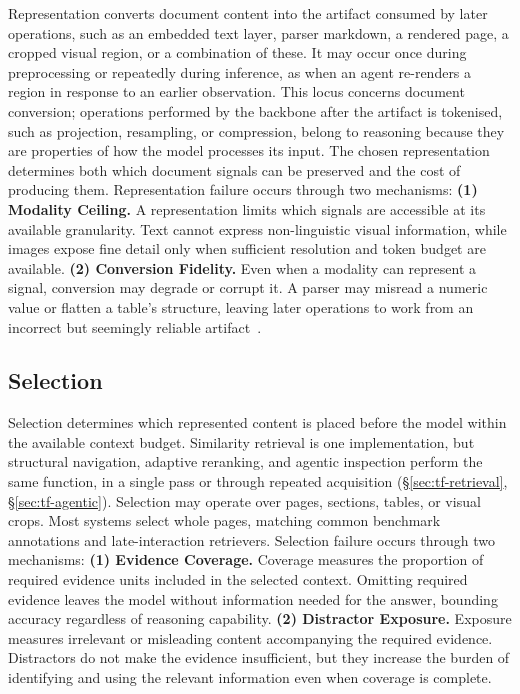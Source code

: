 Representation converts document content into the artifact consumed by later operations, such as an embedded text layer, parser markdown, a rendered page, a cropped visual region, or a combination of these. It may occur once during preprocessing or repeatedly during inference, as when an agent re-renders a region in response to an earlier observation. This locus concerns document conversion; operations performed by the backbone after the artifact is tokenised, such as projection, resampling, or compression, belong to reasoning because they are properties of how the model processes its input. The chosen representation determines both which document signals can be preserved and the cost of producing them. Representation failure occurs through two mechanisms:
\textbf{(1) Modality Ceiling.} A representation limits which signals are accessible at its available granularity. Text cannot express non-linguistic visual information, while images expose fine detail only when sufficient resolution and token budget are available.
\textbf{(2) Conversion Fidelity.} Even when a modality can represent a signal, conversion may degrade or corrupt it. A parser may misread a numeric value or flatten a table's structure, leaving later operations to work from an incorrect but seemingly reliable artifact~\citep{zhang2025ocr}.

\subsection{Selection}
\label{sec:fm_selection}

Selection determines which represented content is placed before the model within the available context budget. Similarity retrieval is one implementation, but structural navigation, adaptive reranking, and agentic inspection perform the same function, in a single pass or through repeated acquisition (\S\ref{sec:tf-retrieval}, \S\ref{sec:tf-agentic}). Selection may operate over pages, sections, tables, or visual crops. Most systems select whole pages, matching common benchmark annotations and late-interaction retrievers. Selection failure occurs through two mechanisms:
\textbf{(1) Evidence Coverage.} Coverage measures the proportion of required evidence units included in the selected context. Omitting required evidence leaves the model without information needed for the answer, bounding accuracy regardless of reasoning capability.
\textbf{(2) Distractor Exposure.} Exposure measures irrelevant or misleading content accompanying the required evidence. Distractors do not make the evidence insufficient, but they increase the burden of identifying and using the relevant information even when coverage is complete.

